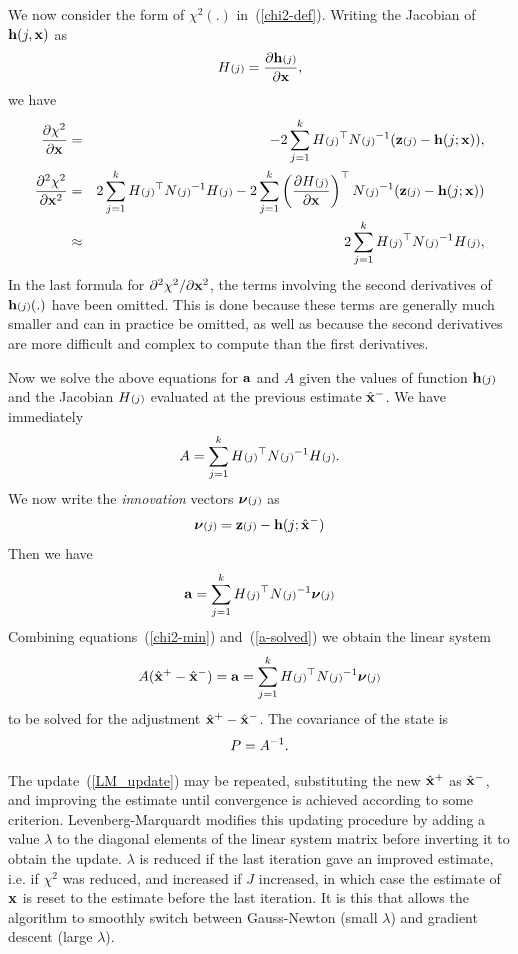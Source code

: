 \documentclass{article}
\begin{document}
We now consider the form of $\chi^2(.)$ in~(\ref{chi2-def}).
Writing the Jacobian of ${\bf h}(j,{\bf x})$ as
\[ H{\scriptstyle (j)}=\frac{\partial {\bf h}{\scriptstyle (j)}}{\partial {\bf x}},
\]
we have
\begin{eqnarray}
 \frac{\partial \chi^2}{\partial {\bf x}} &=& -2\sum_{j=1}^k H{\scriptstyle (j)}^{\top} N{\scriptstyle (j)}^{-1} ({\bf z}{\scriptstyle (j)}-{\bf h}(j;{\bf x})), \label{chi2p-def} \\
 \frac{\partial^2 \chi^2}{\partial {\bf x}^2} &=& 2\sum_{j=1}^k H{\scriptstyle (j)}^{\top} N{\scriptstyle (j)}^{-1} H{\scriptstyle (j)} - 2\sum_{j=1}^k \left(\frac{\partial H{\scriptstyle (j)}}{\partial {\bf x}}\right)^{\top} N{\scriptstyle (j)}^{-1} ({\bf z}{\scriptstyle (j)}-{\bf h}(j;{\bf x})) \nonumber \\
            &\approx& 2\sum_{j=1}^k H{\scriptstyle (j)}^{\top} N{\scriptstyle (j)}^{-1} H{\scriptstyle (j)}, \label{chi2pp-def}
\end{eqnarray}
In the last formula for $\partial^2 \chi^2/\partial {\bf x}^2$, the terms
involving the second derivatives of ${\bf h}{\scriptstyle (j)}(.)$
have been omitted. This is done because these terms are
generally much smaller and can in practice be omitted, as well as because
the second derivatives are more difficult and complex to compute than the
first derivatives.

Now we solve the above equations for ${\bf a}$ and $A$ given
the values of function ${\bf h}{\scriptstyle (j)}$ and the Jacobian $H{\scriptstyle (j)}$
evaluated at the previous estimate $\hat{\bf x}^-$.
We have immediately
\[ A = \sum_{j=1}^k H{\scriptstyle (j)}^{\top} N{\scriptstyle (j)}^{-1} H{\scriptstyle (j)}.
\]
We now write the {\em innovation} vectors $\mbox{\boldmath $\nu$}{\scriptstyle (j)}$ as
\[ \mbox{\boldmath $\nu$}{\scriptstyle (j)} = {\bf z}{\scriptstyle (j)} - {\bf h}(j;\hat{\bf x}^-)
\]
Then we have
\begin{equation}
 {\bf a} = \sum_{j=1}^k H{\scriptstyle (j)}^{\top} N{\scriptstyle (j)}^{-1} \mbox{\boldmath $\nu$}{\scriptstyle (j)} \label{a-solved}
\end{equation}
Combining equations~(\ref{chi2-min}) and~(\ref{a-solved}) we
obtain the linear system
\begin{equation}
 A (\hat{\bf x}^+ - \hat{\bf x}^-) = {\bf a} = \sum_{j=1}^k H{\scriptstyle (j)}^{\top} N{\scriptstyle (j)}^{-1} \mbox{\boldmath $\nu$}{\scriptstyle (j)}
 \label{LM_update}
\end{equation}
to be solved for the adjustment $\hat{\bf x}^+ - \hat{\bf x}^-$.
The covariance of the state is
\[ P = A^{-1}.
\]

The update~(\ref{LM_update}) may be repeated,
substituting the new $\hat{\bf x}^+$ as $\hat{\bf x}^-$, and
improving the estimate until convergence is achieved according to some
criterion. Levenberg-Marquardt modifies this updating procedure by
adding a value $\lambda$ to the diagonal elements of the linear system matrix
before inverting it to obtain the update.
$\lambda$ is reduced if the last iteration gave
an improved estimate, i.e. if $\chi^2$ was reduced, and increased if $J$
increased, in which case the estimate of ${\bf x}$ is reset to the
estimate before the last iteration. It is this that allows the algorithm
to smoothly switch between Gauss-Newton (small $\lambda$) and gradient
descent (large $\lambda$).
\end{document}
